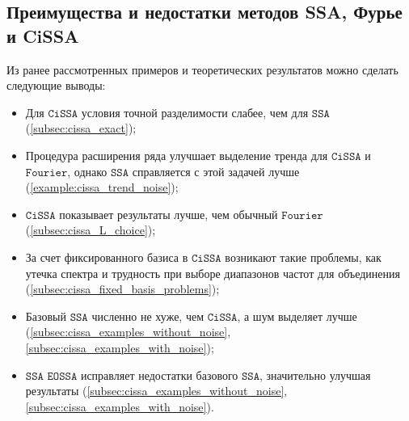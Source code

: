 \documentclass[12pt, specialist, subf
]{disser}
\theoremstyle{definition}
\newcommand{\SSA}{\texttt{SSA}}
\newcommand{\EOSSA}{\texttt{SSA EOSSA}}
\newcommand{\CISSA}{\texttt{CiSSA}}
\newcommand{\FOURIER}{\texttt{Fourier}}
\newcommand{\TS}{\mathsf{X}}
\begin{document}
\subsection{Преимущества и недостатки методов SSA, Фурье и CiSSA}


Из ранее рассмотренных примеров и теоретических результатов можно сделать следующие выводы:

\begin{itemize}
	\item Для $\CISSA$ условия точной разделимости слабее, чем для $\SSA$ (\ref{subsec:cissa_exact});
	\item Процедура расширения ряда улучшает выделение тренда для $\CISSA$ и $\FOURIER$, однако $\SSA$ справляется с этой задачей лучше (\ref{example:cissa_trend_noise});
	\item $\CISSA$ показывает результаты лучше, чем обычный $\FOURIER$ (\ref{subsec:cissa_L_choice});
	\item За счет фиксированного базиса в $\CISSA$ возникают такие проблемы, как утечка спектра и трудность при выборе диапазонов частот для объединения (\ref{subsec:cissa_fixed_basis_problems});
	\item Базовый $\SSA$ численно не хуже, чем $\CISSA$, а шум выделяет лучше (\ref{subsec:cissa_examples_without_noise}, \ref{subsec:cissa_examples_with_noise});
	\item $\EOSSA$ исправляет недостатки базового $\SSA$, значительно улучшая результаты (\ref{subsec:cissa_examples_without_noise}, \ref{subsec:cissa_examples_with_noise}). 
\end{itemize}


\end{document}
